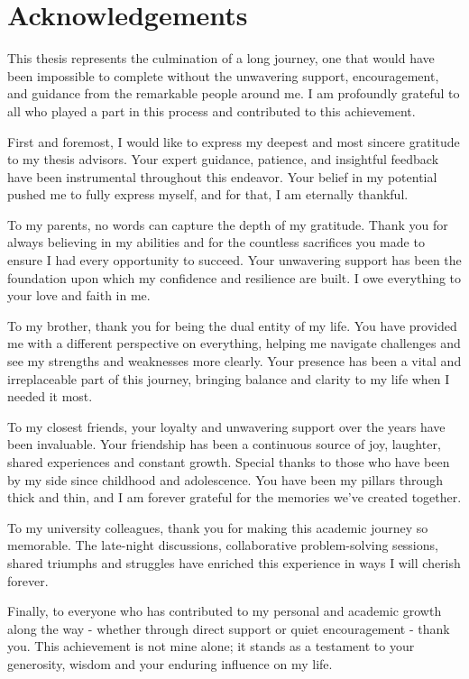 \chapter*{Acknowledgements}

This thesis represents the culmination of a long journey, one that would have been impossible to complete without the unwavering support, encouragement, and guidance from the remarkable people around me. I am profoundly grateful to all who played a part in this process and contributed to this achievement.

First and foremost, I would like to express my deepest and most sincere gratitude to my thesis advisors. Your expert guidance, patience, and insightful feedback have been instrumental throughout this endeavor. Your belief in my potential pushed me to fully express myself, and for that, I am eternally thankful.

To my parents, no words can capture the depth of my gratitude. Thank you for always believing in my abilities and for the countless sacrifices you made to ensure I had every opportunity to succeed. Your unwavering support has been the foundation upon which my confidence and resilience are built. I owe everything to your love and faith in me.

To my brother, thank you for being the dual entity of my life. You have provided me with a different perspective on everything, helping me navigate challenges and see my strengths and weaknesses more clearly. Your presence has been a vital and irreplaceable part of this journey, bringing balance and clarity to my life when I needed it most.

To my closest friends, your loyalty and unwavering support over the years have been invaluable. Your friendship has been a continuous source of joy, laughter, shared experiences and constant growth. Special thanks to those who have been by my side since childhood and adolescence. You have been my pillars through thick and thin, and I am forever grateful for the memories we've created together.

To my university colleagues, thank you for making this academic journey so memorable. The late-night discussions, collaborative problem-solving sessions, shared triumphs and struggles have enriched this experience in ways I will cherish forever.

Finally, to everyone who has contributed to my personal and academic growth along the way - whether through direct support or quiet encouragement - thank you. This achievement is not mine alone; it stands as a testament to your generosity, wisdom and your enduring influence on my life.